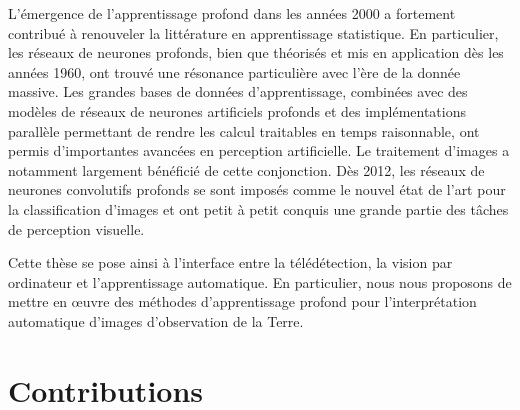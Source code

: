 L'émergence de l'apprentissage profond dans les années 2000 a fortement contribué à renouveler la littérature en apprentissage statistique. En particulier, les réseaux de neurones profonds, bien que théorisés et mis en application dès les années 1960, ont trouvé une résonance particulière avec l'ère de la donnée massive. Les grandes bases de données d'apprentissage, combinées avec des modèles de réseaux de neurones artificiels profonds et des implémentations parallèle permettant de rendre les calcul traitables en temps raisonnable, ont permis d'importantes avancées en perception artificielle. Le traitement d'images a notamment largement bénéficié de cette conjonction. Dès 2012, les réseaux de neurones convolutifs profonds se sont imposés comme le nouvel état de l'art pour la classification d'images et ont petit à petit conquis une grande partie des tâches de perception visuelle.

Cette thèse se pose ainsi à l'interface entre la télédétection, la vision par ordinateur et l'apprentissage automatique. En particulier, nous nous proposons de mettre en \oe{}uvre des méthodes d'apprentissage profond pour l'interprétation automatique d'images d'observation de la Terre.


\section{Contributions}



